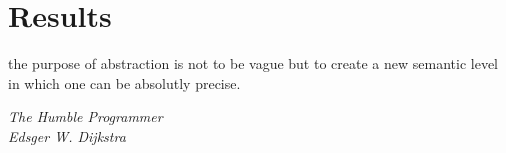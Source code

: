 \chapter{Results}\label{chapter:Results}

\epigraph{the purpose of abstraction is not to be vague but to create a new semantic level in which one can be absolutly precise.}{\textit{The Humble Programmer\\Edsger W. Dijkstra}}


\newpage

\newpage

